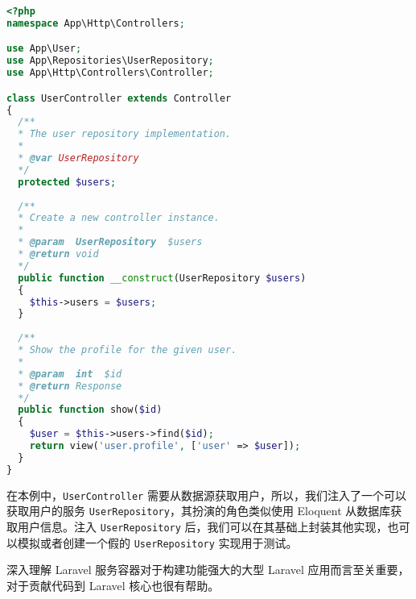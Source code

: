 \documentclass{progartcn}
\begin{document}
\begin{lstlisting}[language=PHP]
<?php
namespace App\Http\Controllers;

use App\User;
use App\Repositories\UserRepository;
use App\Http\Controllers\Controller;

class UserController extends Controller
{
  /**
  * The user repository implementation.
  *
  * @var UserRepository
  */
  protected $users;
  
  /**
  * Create a new controller instance.
  * 
  * @param  UserRepository  $users
  * @return void
  */
  public function __construct(UserRepository $users)
  {
    $this->users = $users;
  }
  
  /**
  * Show the profile for the given user.
  *
  * @param  int  $id
  * @return Response
  */
  public function show($id)
  {
    $user = $this->users->find($id);
    return view('user.profile', ['user' => $user]);
  }
}
\end{lstlisting}

在本例中，\verb|UserController| 需要从数据源获取用户，所以，我们注入了一个可以获取用户的服务 \verb|UserRepository|，其扮演的角色类似使用 Eloquent 从数据库获取用户信息。注入 \verb|UserRepository| 后，我们可以在其基础上封装其他实现，也可以模拟或者创建一个假的 \verb|UserRepository| 实现用于测试。

深入理解 Laravel 服务容器对于构建功能强大的大型 Laravel 应用而言至关重要，对于贡献代码到 Laravel 核心也很有帮助。

\end{document}
